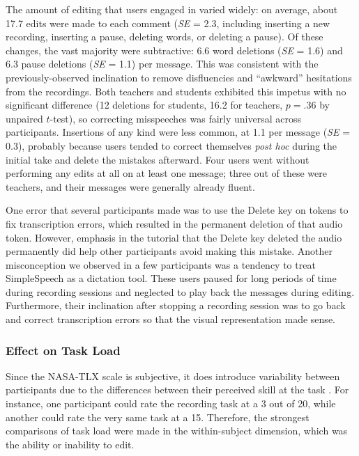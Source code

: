 The amount of editing that users engaged in varied widely: on average, about 17.7 edits were made to each comment (\textit{SE} = 2.3, including inserting a new recording, inserting a pause, deleting words, or deleting a pause). 
Of these changes, the vast majority were subtractive: 6.6 word deletions (\textit{SE} = 1.6) and 6.3 pause deletions (\textit{SE} = 1.1) per message.
This was consistent with the previously-observed inclination to remove disfluencies and ``awkward'' hesitations from the recordings.
Both teachers and students exhibited this impetus with no significant difference (12 deletions for students, 16.2 for teachers, $p=.36$ by unpaired $t$-test), so correcting misspeeches was fairly universal across participants.
Insertions of any kind were less common, at 1.1 per message (\textit{SE} = 0.3), probably because users tended to correct themselves \emph{post hoc} during the initial take and delete the mistakes afterward.
Four users went without performing any edits at all on at least one message; three out of these were teachers, and their messages were generally already fluent.

One error that several participants made was to use the Delete key on tokens to fix transcription errors, which resulted in the permanent deletion of that audio token. 
However, emphasis in the tutorial that the Delete key deleted the audio permanently did help other participants avoid making this mistake.
Another misconception we observed in a few participants was a tendency to treat SimpleSpeech as a dictation tool. 
These users paused for long periods of time during recording sessions and neglected to play back the messages during editing. 
Furthermore, their inclination after stopping a recording session was to go back and correct transcription errors so that the visual representation made sense.

\vfill

\subsubsection{Effect on Task Load}
Since the NASA-TLX scale is subjective, it does introduce variability between participants due to the differences between their perceived skill at the task \cite{nasatlx}. 
For instance, one participant could rate the recording task at a 3 out of 20, while another could rate the very same task at a 15.
Therefore, the strongest comparisons of task load were made in the within-subject dimension, which was the ability or inability to edit.

